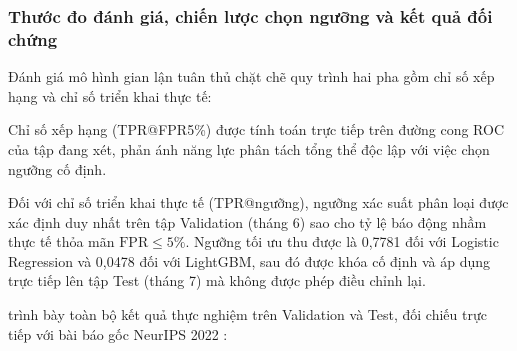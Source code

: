\subsubsection{Thước đo đánh giá, chiến lược chọn ngưỡng và kết quả đối chứng}
Đánh giá mô hình gian lận tuân thủ chặt chẽ quy trình hai pha gồm chỉ số xếp hạng và chỉ số triển khai thực tế:

Chỉ số xếp hạng (TPR@FPR5\%) được tính toán trực tiếp trên đường cong ROC của tập đang xét, phản ánh năng lực phân tách tổng thể độc lập với việc chọn ngưỡng cố định.

Đối với chỉ số triển khai thực tế (TPR@ngưỡng), ngưỡng xác suất phân loại được xác định duy nhất trên tập Validation (tháng 6) sao cho tỷ lệ báo động nhầm thực tế thỏa mãn $\text{FPR} \le 5\%$. Ngưỡng tối ưu thu được là 0,7781 đối với Logistic Regression và 0,0478 đối với LightGBM, sau đó được khóa cố định và áp dụng trực tiếp lên tập Test (tháng 7) mà không được phép điều chỉnh lại.

 trình bày toàn bộ kết quả thực nghiệm trên Validation và Test, đối chiếu trực tiếp với bài báo gốc NeurIPS 2022 \cite{jesus2022turning}:

\begin{table}[H]
  \centering
  \caption{Hiệu năng Logistic Regression và LightGBM trên Validation (tháng 6), Test (tháng 7) và đối chiếu với mốc tham chiếu bài báo gốc \cite{jesus2022turning}.}
  \label{tab:tab_results}
\end{table}

